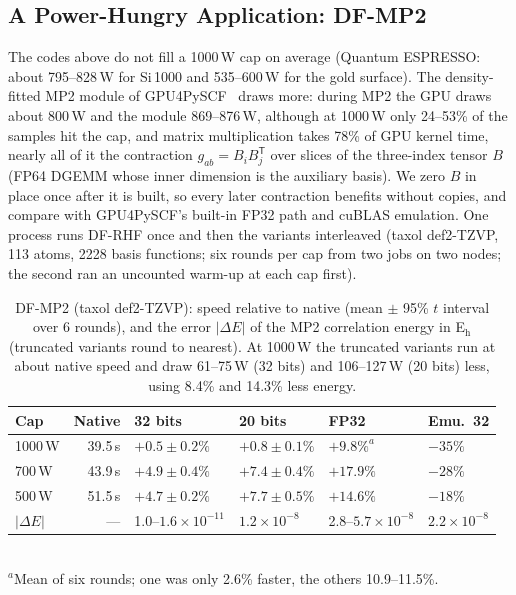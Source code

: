 \documentclass[conference]{IEEEtran}
\newcommand{\W}{\,W}
\newcommand{\ee}[2]{#1{\times}10^{#2}}  %
\newcommand{\pct}{\%}
\begin{document}
\subsection{A Power-Hungry Application: DF-MP2}\label{sec:mp2}

The codes above do not fill a 1000\W{} cap on average (Quantum ESPRESSO: about 795--828\W{} for Si\,1000 and
535--600\W{} for the gold surface). The density-fitted MP2 module of GPU4PySCF~\cite{Wu2025} draws more: during MP2
the GPU draws about 800\W{} and the module 869--876\W, although at 1000\W{} only 24--53\pct{} of the samples hit the
cap, and matrix multiplication takes 78\pct{} of GPU kernel time, nearly all of it the contraction
$g_{ab}=B_iB_j^{\mathsf T}$ over slices of the three-index tensor $B$ (FP64 DGEMM whose inner dimension is the
auxiliary basis). We zero $B$ in place once after it is built, so every later contraction benefits without copies,
and compare with GPU4PySCF's built-in FP32 path and cuBLAS emulation. One process runs DF-RHF once and then the
variants interleaved (taxol def2-TZVP, 113 atoms, 2228 basis functions; six rounds per cap from two jobs on two nodes;
the second ran an uncounted warm-up at each cap first).

\begin{table}[t]
\caption{DF-MP2 (taxol def2-TZVP): speed relative to native (mean $\pm$ 95\pct{} $t$ interval over 6 rounds), and the
error $|\Delta E|$ of the MP2 correlation energy in E$_\mathrm{h}$ (truncated variants round to nearest). At 1000\W{}
the truncated variants run at about native speed and draw 61--75\W{} (32 bits) and 106--127\W{} (20 bits) less, using
8.4\pct{} and 14.3\pct{} less energy.}\label{tab:mp2}
\centering\footnotesize\setlength{\tabcolsep}{2.2pt}
\begin{tabular}{@{}lrllll@{}}
\toprule
Cap & Native & 32 bits & 20 bits & FP32 & Emu.\ 32 \\
\midrule
1000\W & 39.5\,s & $+0.5\pm0.2\pct$ & $+0.8\pm0.1\pct$ & $+9.8\pct^{a}$ & $-35\pct$ \\
700\W & 43.9\,s & $+4.9\pm0.4\pct$ & $+7.4\pm0.4\pct$ & $+17.9\pct$ & $-28\pct$ \\
500\W & 51.5\,s & $+4.7\pm0.2\pct$ & $+7.7\pm0.5\pct$ & $+14.6\pct$ & $-18\pct$ \\
\midrule
$|\Delta E|$ & --- & 1.0--$\ee{1.6}{-11}$ & $\ee{1.2}{-8}$ & 2.8--$\ee{5.7}{-8}$ & $\ee{2.2}{-8}$ \\
\bottomrule
\end{tabular}
\\[2pt]{\scriptsize $^{a}$Mean of six rounds; one was only 2.6\pct{} faster, the others 10.9--11.5\pct.}
\end{table}
\end{document}
